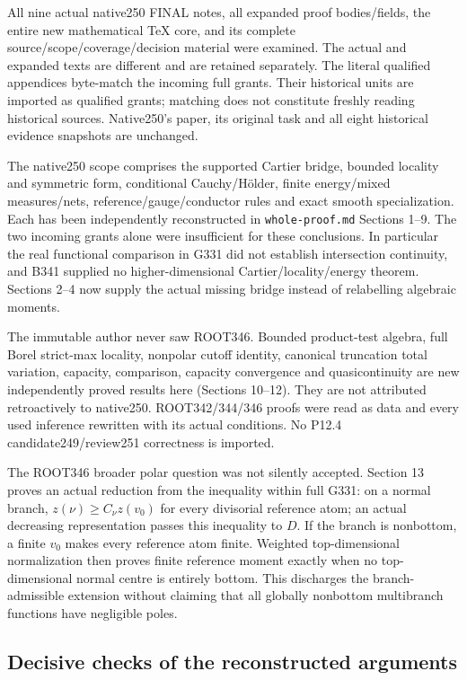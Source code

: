 \documentclass[
]{article}
\begin{document}
All nine actual native250 FINAL notes, all expanded proof bodies/fields,
the entire new mathematical TeX core, and its complete
source/scope/coverage/decision material were examined. The actual and
expanded texts are different and are retained separately. The literal
qualified appendices byte-match the incoming full grants. Their
historical units are imported as qualified grants; matching does not
constitute freshly reading historical sources. Native250's paper, its
original task and all eight historical evidence snapshots are unchanged.

The native250 scope comprises the supported Cartier bridge, bounded
locality and symmetric form, conditional Cauchy/Hölder, finite
energy/mixed measures/nets, reference/gauge/conductor rules and exact
smooth specialization. Each has been independently reconstructed in
\texttt{whole-proof.md} Sections 1--9. The two incoming grants alone
were insufficient for these conclusions. In particular the real
functional comparison in G331 did not establish intersection continuity,
and B341 supplied no higher-dimensional Cartier/locality/energy theorem.
Sections 2--4 now supply the actual missing bridge instead of
relabelling algebraic moments.

The immutable author never saw ROOT346. Bounded product-test algebra,
full Borel strict-max locality, nonpolar cutoff identity, canonical
truncation total variation, capacity, comparison, capacity convergence
and quasicontinuity are new independently proved results here (Sections
10--12). They are not attributed retroactively to native250.
ROOT342/344/346 proofs were read as data and every used inference
rewritten with its actual conditions. No P12.4 candidate249/review251
correctness is imported.

The ROOT346 broader polar question was not silently accepted. Section 13
proves an actual reduction from the inequality within full G331: on a
normal branch, \(z(\nu)\ge C_\nu z(v_0)\) for every divisorial reference
atom; an actual decreasing representation passes this inequality to
\(D\). If the branch is nonbottom, a finite \(v_0\) makes every
reference atom finite. Weighted top-dimensional normalization then
proves finite reference moment exactly when no top-dimensional normal
centre is entirely bottom. This discharges the branch-admissible
extension without claiming that all globally nonbottom multibranch
functions have negligible poles.

\subsection{Decisive checks of the reconstructed
arguments}\label{decisive-checks-of-the-reconstructed-arguments}
\end{document}
